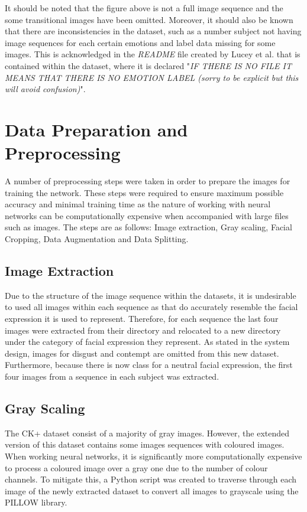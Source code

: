 It should be noted that the figure above is not a full image sequence and the some transitional images have been omitted. Moreover, it should also be known that there are inconsistencies in the dataset, such as a number subject not having image sequences for each certain emotions and label data missing for some images. This is acknowledged in the \textit{README} file created by Lucey et al. that is contained within the dataset, where it is declared "\textit{IF THERE IS NO FILE IT MEANS THAT THERE IS NO EMOTION LABEL (sorry to be explicit but this will avoid confusion)}". 

\section{Data Preparation and Preprocessing}
A number of preprocessing steps were taken in order to prepare the images for training the network. These steps were required to ensure maximum possible accuracy and minimal training time as the nature of working with neural networks can be computationally expensive when accompanied with large files such as images. The steps are as follows: Image extraction, Gray scaling, Facial Cropping, Data Augmentation and Data Splitting.

\subsection{Image Extraction}
Due to the structure of the image sequence within the datasets, it is undesirable to used all images within each sequence as that do accurately resemble the facial expression it is used to represent. Therefore, for each sequence the last four images were extracted from their directory and relocated to a new directory under the category of facial expression they represent. As stated in the system design, images for disgust and contempt are omitted from this new dataset. Furthermore, because there is now class for a neutral facial expression, the first four images from a sequence in each subject was extracted.

\subsection{Gray Scaling}
The CK+ dataset consist of a majority of gray images. However, the extended version of this dataset contains some images sequences with coloured images. When working neural networks, it is significantly more computationally expensive to process a coloured image over a gray one due to the number of colour channels. To mitigate this, a Python script was created to traverse through each image of the newly extracted dataset to convert all images to grayscale using the PILLOW library. \\

